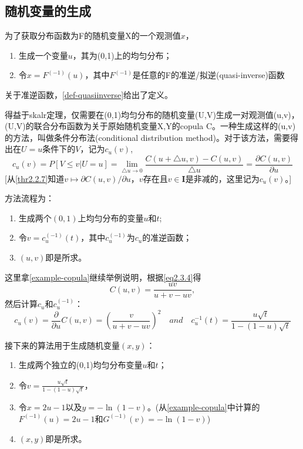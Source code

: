 \subsection{随机变量的生成}
为了获取分布函数为F的随机变量X的一个观测值$x$，
\begin{enumerate}[1.]
    \item 生成一个变量$u$，其为(0,1)上的均匀分布；
    \item 令$x = F^{(-1)}(u)$，其中$F^{(-1)}$是任意的F的准逆/拟逆(quasi-inverse)函数
\end{enumerate}
关于准逆函数，\cref{def-quasiinverse}给出了定义。

得益于skalr定理，仅需要在(0,1)均匀分布的随机变量(U,V)生成一对观测值(u,v)，(U,V)的联合分布函数为关于原始随机变量X,Y的copula C。一种生成这样的(u,v)的方法，叫做条件分布法(conditional distribution method)。对于该方法，需要得出在$U=u$条件下的$V$，记为$c_u(v)$,
\begin{equation}
    c_u(v) = P[V \leq v| U=u] = \lim_{\bigtriangleup u \rightarrow 0} \dfrac{C(u+\bigtriangleup u,v)-C(u,v)}{\bigtriangleup u} = \dfrac{\partial C(u,v)}{\partial u}
    \label{eq-condionaldistribution}
\end{equation}
[从\cref{thr2.2.7}知道$v \longmapsto \partial C(u,v)/\partial u$，$v$存在且$v \in \mathbf{I}$是非减的，这里记为$c_u(v)$。]

方法流程为：
\begin{enumerate}[1.]
    \item 生成两个$(0,1)$上均匀分布的变量$u$和$t$;
    \item 令$v = c_u^{(-1)}(t)$，其中$c_u^{(-1)}$为$c_u$的准逆函数；
    \item $(u,v)$即是所求。
\end{enumerate}
\begin{example}
    这里拿\cref{example-copula}继续举例说明，根据\cref{eq2.3.4}得
    \begin{equation*}
        C(u,v) = \dfrac{uv}{u+v-uv}, 
    \end{equation*}
    然后计算$c_u$和$c_u^{(-1)}$：
    \begin{equation*}
        c_u(v) = \dfrac{\partial}{\partial u}C(u,v) = \left(\dfrac{v}{u+v-uv}\right)^2 \quad and \quad c_u^{-1}(t) = \dfrac{u \sqrt{t}}{1-(1-u)\sqrt{t}}
    \end{equation*}
    \label{example-cgeneration}
\end{example}
接下来的算法用于生成随机变量$(x,y)$：
\begin{enumerate}
    \item 生成两个独立的(0,1)均匀分布变量$u$和$t$；
    \item 令$v = \frac{u\sqrt{t}}{1-(1-u)\sqrt{t}}$，
    \item 令$x = 2u-1$以及$y=-\ln(1-v)$。(从\cref{example-copula}中计算的$F^{(-1)}(u)=2u-1$和$G^{(-1)}(v)=-\ln(1-v)$)
    \item $(x,y)$即是所求。
\end{enumerate}


